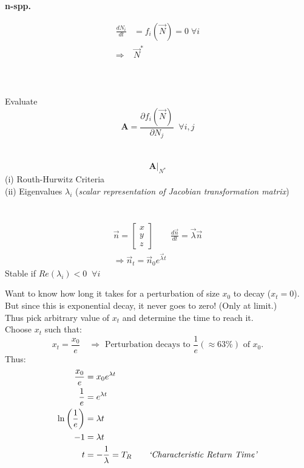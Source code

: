 \documentclass{article}
\newcommand{\ind}{\-\hspace{1cm}}
\begin{document}
\begin{minipage}[t]{0.3\textwidth}
	\begin{center}\textbf{n-spp.}\end{center}
	\begin{align*}\frac{dN_i}{dt}& =f_i(\vec{N})=0\; \forall i\\\Rightarrow & \vec{N}^*\end{align*}\\ \\ \\
	\ind Evaluate\\
	\begin{equation*} \mathbf{A}=\frac{\partial f_i(\vec{N})}{\partial N_j} \; \; \forall i,j	\end{equation*}\\ \\
	\begin{equation*} \mathbf{A}\vert_{N^*}	\end{equation*}
	 (i) Routh-Hurwitz Criteria\\
	 (ii) Eigenvalues $\lambda_i$ (\emph{scalar representation of Jacobian transformation matrix})\\ \\ \\ 
	 \begin{align*}
		 \vec{n}=\begin{bmatrix} x\\y\\z \end{bmatrix} \qquad \frac{d\vec{n}}{dt}=\vec{\lambda} \vec{n}\\
		 \Rightarrow \vec{n}_t=\vec{n}_0 e^{\vec{\lambda} t}
	 \end{align*}
	 	\ind Stable if $Re(\lambda_i) < 0 \; \; \forall i $
\end{minipage}
\vspace{2cm}

Want to know how long it takes for a perturbation of size $x_0$ to decay ($x_t=0$).\\
\ind But since this is exponential decay, it never goes to zero! (Only at limit.)\\

Thus pick arbitrary value of $x_t$ and determine the time to reach it.\\
\ind Choose $x_t$ such that:
\begin{equation*}
x_t = \frac{x_0}{e} \quad \Rightarrow \text{ Perturbation decays to } \frac{1}{e} (\approx 63\%) \text{ of } x_0.
\end{equation*}
Thus:
\begin{align*}
	\frac{x_0}{e}&=x_0 e^{\lambda t}\\
	\frac{1}{e} &= e^{\lambda t}\\
	\ln\left(\frac{1}{e}\right)&=\lambda t\\
	-1 & = \lambda t\\
	t & = - \frac{1}{\lambda} = T_R \qquad \text{\emph{`Characteristic Return Time'}}
\end{align*}
\end{document}
